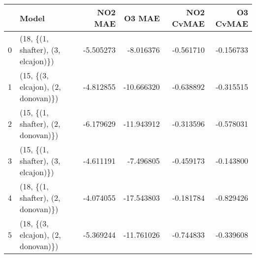 \begin{tabular}{llrrrr}
\toprule
{} &                               Model &   NO2 MAE &     O3 MAE &  NO2 CvMAE &  O3 CvMAE \\
\midrule
0 &  (18, \{(1, shafter), (3, elcajon)\}) & -5.505273 &  -8.016376 &  -0.561710 & -0.156733 \\
1 &  (15, \{(3, elcajon), (2, donovan)\}) & -4.812855 & -10.666320 &  -0.638892 & -0.315515 \\
2 &  (15, \{(1, shafter), (2, donovan)\}) & -6.179629 & -11.943912 &  -0.313596 & -0.578031 \\
3 &  (15, \{(1, shafter), (3, elcajon)\}) & -4.611191 &  -7.496805 &  -0.459173 & -0.143800 \\
4 &  (18, \{(1, shafter), (2, donovan)\}) & -4.074055 & -17.543803 &  -0.181784 & -0.829426 \\
5 &  (18, \{(3, elcajon), (2, donovan)\}) & -5.369244 & -11.761026 &  -0.744833 & -0.339608 \\
\bottomrule
\end{tabular}

